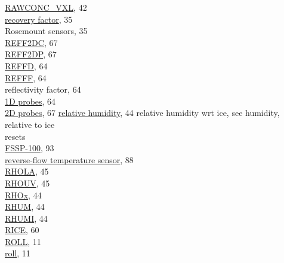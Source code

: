 \documentclass[
]{article}
\begin{document}
\href{./4-the-state-of-the-atmosphere.html\#vcsel-uncor}{RAWCONC\_VXL},
42\\
\href{./4-the-state-of-the-atmosphere.html\#ATX}{recovery factor}, 35\\
\hspace*{0.333em}\hspace*{0.333em}Rosemount sensors, 35\\
\href{./5-cloud-physics-variables.html\#reff2d}{REFF2DC}, 67\\
\href{./5-cloud-physics-variables.html\#reff2d}{REFF2DP}, 67\\
\href{./5-cloud-physics-variables.html\#effective-radius}{REFFD}, 64\\
\href{./5-cloud-physics-variables.html\#effective-radius}{REFFF}, 64\\
reflectivity factor, 64\\
\hspace*{0.333em}\hspace*{0.333em}\href{./5-cloud-physics-variables.html\#DBZ}{1D
probes}, 64\\
\hspace*{0.333em}\hspace*{0.333em}\href{./5-cloud-physics-variables.html\#dbz2d}{2D
probes}, 67 \href{./4-the-state-of-the-atmosphere.html\#rhumw}{relative
humidity}, 44 relative humidity wrt ice, see humidity, relative to ice\\
resets\\
\hspace*{0.333em}\hspace*{0.333em}\href{./10-obsolete-variables.html\#freset}{FSSP-100},
93\\
\href{./10-obsolete-variables.html\#ttrf}{reverse-flow temperature
sensor}, 88\\
\href{./4-the-state-of-the-atmosphere.html\#rho}{RHOLA}, 45\\
\href{./4-the-state-of-the-atmosphere.html\#rho}{RHOUV}, 45\\
\href{./4-the-state-of-the-atmosphere.html\#rho}{RHOx}, 44\\
\href{./4-the-state-of-the-atmosphere.html\#rhumw}{RHUM}, 44\\
\href{./4-the-state-of-the-atmosphere.html\#rhumi}{RHUMI}, 44\\
\href{./5-cloud-physics-variables.html\#rice}{RICE}, 60\\
\href{./3-the-state-of-the-aircraft.html\#roll}{ROLL}, 11\\
\href{./3-the-state-of-the-aircraft.html\#roll}{roll}, 11\\
\end{document}
